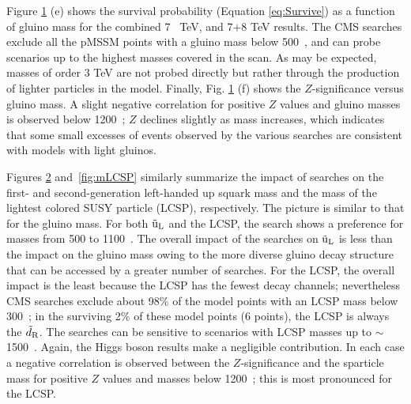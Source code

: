\begin{figure}[t]
\vspace{1mm}
    \caption{}
    \label{fig:mg}
\end{figure}

Figure \ref{fig:mg} (e) shows the survival probability (Equation \ref{eq:Survive}) as a function of gluino mass
for the combined 7~ TeV, and 7$+$8 TeV results. 
The CMS searches exclude all the pMSSM points with a gluino mass below 500~\GeV, and can probe scenarios up to the highest masses covered in the scan.  As may be expected, masses of order 3 TeV are not probed directly but rather through the production of lighter particles in the model.   
Finally, Fig. \ref{fig:mg} (f) shows the $Z$-significance versus gluino mass.  A
slight negative correlation for positive $Z$ values and gluino masses
is observed below 1200~\GeV; $Z$ declines slightly as mass
increases, which indicates that some small excesses of events observed by the various searches are consistent with models with light gluinos.  


Figures \ref{fig:mq} and~\ref{fig:mLCSP} similarly summarize the impact
of searches on the first- and second-generation left-handed up squark mass and the mass of the lightest colored SUSY particle (LCSP), respectively.  The picture is similar to that for the gluino mass.  For both $\tilde{\text{u}}_\text{L}$ and the LCSP, the \MTtwo{} search shows a preference for masses from 500 to 1100~\GeV.  The overall impact of the searches on $\tilde{\text{u}}_\text{L}$ is less than the impact on the gluino mass owing to the more diverse gluino decay structure that can be accessed by a greater number of searches.  For the LCSP, the overall impact is the least  because the LCSP has the fewest decay channels; nevertheless CMS searches exclude about 98\% of the model points with an LCSP mass below 300~\GeV; in the surviving 2\% of these model points (6 points), the LCSP is always the $\tilde{d}_{\rm R}$.  The searches can be sensitive to scenarios with LCSP masses up to $\sim$1500~\GeV.  Again, the
Higgs boson results  make a negligible contribution. In each case a negative correlation is observed between the $Z$-significance and the sparticle mass for positive $Z$ values and masses below 1200~\GeV; this is most pronounced for the LCSP.

\begin{figure}[t]
    \vspace{1mm}
    \caption{}
    \label{fig:mq}
\end{figure}

